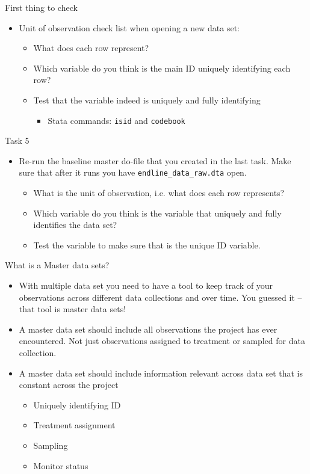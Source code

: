 \documentclass[aspectratio=169]{beamer}
\begin{document}
\begin{frame}{First thing to check}
\begin{itemize}
	\item Unit of observation check list when opening a new data set:
	\begin{itemize}
		\item What does each row represent?
		\item Which variable do you think is the main ID uniquely identifying each row?
		\item Test that the variable indeed is uniquely and fully identifying
			\begin{itemize}
				\item Stata commands: \texttt{isid} and \texttt{codebook}
			\end{itemize}		
	\end{itemize}
\end{itemize}
\end{frame}


\begin{frame}{Task 5}
\begin{itemize}
	\item Re-run the baseline master do-file that you created in the last task. Make sure that after it runs you have  \texttt{endline\_data\_raw.dta} open.
	\begin{itemize}
		\item What is the unit of observation, i.e. what does each row represents?		
		\item Which variable do you think is the variable that uniquely and fully identifies the data set?		
		\item Test the variable to make sure that is the unique ID variable.
	\end{itemize}
\end{itemize}
\end{frame}


\begin{frame}{What is a Master data sets?}
\begin{itemize}
	\item With multiple data set you need to have a tool to keep track of your observations across different data collections and over time. You guessed it – that tool is master data sets!
	\item A master data set should include all observations the project has ever encountered. Not just observations assigned to treatment or sampled for data collection.
	\item A master data set should include information relevant across data set that is constant across the project
	\begin{itemize}
		\item Uniquely identifying ID
		\item Treatment assignment
		\item Sampling
		\item Monitor status		
	\end{itemize}
\end{itemize}
\end{frame}
\end{document}
